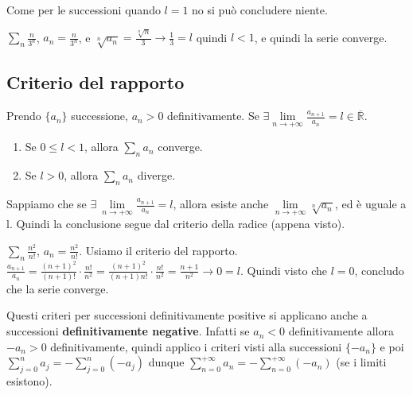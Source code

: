 \begin{observation}
Come per le successioni quando $l=1$ no si può concludere niente.
\end{observation}

\begin{example}
$\sum_n \frac{n}{3^n}$, $a_n = \frac{n}{3^n}$, e $\sqrt[n]{a_n} = \frac{\sqrt[n]{n}}{3} \to \frac{1}{3} = l$ quindi $l < 1$, e quindi la serie converge.
\end{example}

\newpage
\subsection{Criterio del rapporto}
\begin{theorem}
Prendo $\{a_n\}$ successione, $a_n > 0$ definitivamente. Se $\exists \lim\limits_{n \to +\infty}\frac{a_{n+1}}{a_n} = l \in \overline{\mathbb{R}}$.
\begin{enumerate}
    \item Se $0 \leq l < 1$, allora $\sum_n a_n$ converge.
    \item Se $l > 0$, allora $\sum_n a_n$ diverge.
\end{enumerate}
\end{theorem}

\begin{demostration}
Sappiamo che se $\exists \: \lim\limits_{n\to +\infty}\frac{a_{n+1}}{a_n} = l$, allora esiste anche $\lim\limits_{n\to +\infty}\sqrt[n]{a_n}$, ed è uguale a l. Quindi la conclusione segue dal criterio della radice (appena visto).
\end{demostration}

\begin{example}
$\sum_n \frac{n^2}{n!}$, $a_n = \frac{n^2}{n!}$. Usiamo il criterio del rapporto.\\
$\frac{a_{n+1}}{a_n} = \frac{(n+1)^2}{(n+1)!} \cdot \frac{n!}{n^2} = \frac{(n+1)^2}{(n+1)n!}\cdot \frac{n!}{n^2} = \frac{n+1}{n^2} \to 0 = l$. Quindi visto che $l = 0$, concludo che la serie converge.
\end{example}

\begin{observation}
Questi criteri per successioni definitivamente positive si applicano anche a successioni \textbf{definitivamente negative}. Infatti se $a_n < 0$ definitivamente allora $-a_n > 0$ definitivamente, quindi applico i criteri visti alla successioni $\{-a_n\}$ e poi $\sum_{j=0}^n a_j = -\sum_{j=0}^n(-a_j)$ dunque $\sum_{n=0}^{+\infty}a_n = -\sum_{n=0}^{+\infty}(-a_n)$ (se i limiti esistono).
\end{observation}

